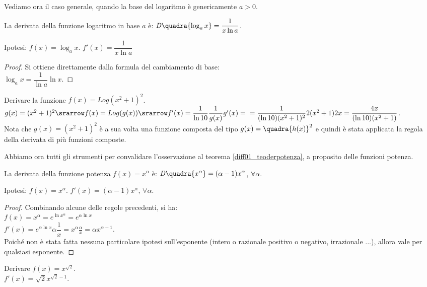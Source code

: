Vediamo ora il caso generale, quando la base del logaritmo è genericamente 
$a>0$.
\begin{teorema}
  La derivata della funzione logaritmo in base $a$ è: 
  $\mathit{D}\quadra{\log_a x}= \dfrac{1}{x\ln a}$.
\end{teorema}
\noindent Ipotesi: $f(x)=\log_a x$. \tab $f'(x)=\dfrac{1}{x\ln a}$
\begin{proof}
Si ottiene direttamente dalla formula del cambiamento di base:\\
$\log_a x=\dfrac{1}{\ln a}\ln x$.
\end{proof}

\begin{esempio}
    Derivare la funzione $f(x)=Log(x^2+1)^2$.\\
    $g(x)=(x^2+1)^2\srarrow f(x)=Log (g(x))\srarrow f'(x)=\dfrac{1}{\ln 10}
    \dfrac{1}{g(x)}g'(x)=\\
    =\dfrac{1}{(\ln 10)(x^2+1)^2}2(x^2+1)2x=\dfrac{4x}{(\ln 10)(x^2+1)}$.\\
    Nota che $g(x)=(x^2+1)^2$ è a sua volta una funzione composta del tipo 
    $g(x)=\quadra{h(x)}^2$ e quindi è stata applicata la regola della 
derivata
    di più funzioni composte.
\end{esempio}

Abbiamo ora tutti gli strumenti per convalidare l'osservazione al teorema 
\ref{diff01_teoderpotenza}, a proposito delle funzioni potenza.

\begin{teorema}
  La derivata della funzione potenza $f(x)=x^\alpha$ è: \hspace{5mm}
  $\mathit{D}\quadra{x^\alpha}=(\alpha-1)x^\alpha$, $\forall\alpha$.
\end{teorema}
\noindent Ipotesi: $f(x)=x^\alpha$. \tab $f'(x)=(\alpha-1)x^\alpha$, 
$\forall \alpha$.
\begin{proof}
Combinando alcune delle regole precedenti, si ha:\\
$f(x)=x^\alpha=e^{\ln x^\alpha}=e^{\alpha\ln x}$\\
$f'(x)=e^{\alpha\ln x}\alpha\dfrac{1}{x}=x^\alpha\frac{\alpha}{x}=
\alpha x^{\alpha-1}$.\\
Poiché non è stata fatta nessuna particolare ipotesi sull'esponente (intero 
o 
razionale positivo o negativo, irrazionale ...), allora vale per qualsiasi
esponente.
\end{proof}

\begin{esempio}
  Derivare $f(x)=x^{\sqrt{2}}$.\\
  $f'(x)=\sqrt{2}x^{\sqrt{2}-1}$.
\end{esempio}


